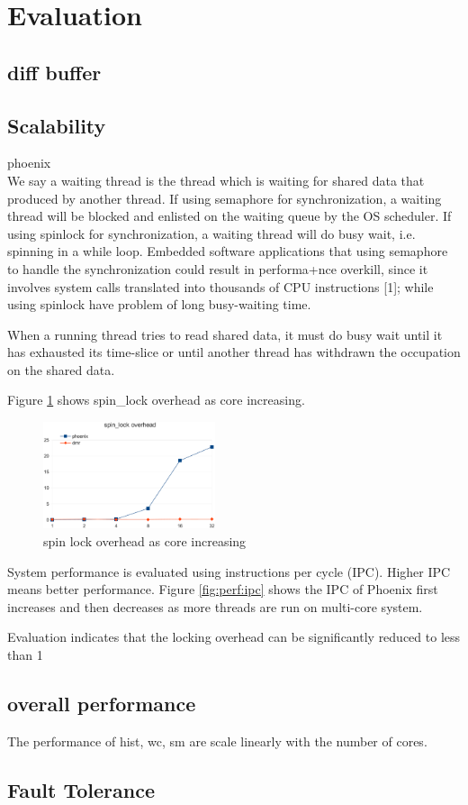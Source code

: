 \section{Evaluation}


\subsection{diff buffer}


\subsection{Scalability}
{\color{red}phoenix }
\\
We say a waiting thread is the thread which is waiting for shared
data that produced by another thread. If using semaphore for
synchronization, a waiting thread will be blocked and enlisted
on the waiting queue by the OS scheduler. If using spinlock
for synchronization, a waiting thread will do busy wait, i.e.
spinning in a while loop. Embedded software applications
that using semaphore to handle the synchronization could
result in performa+nce overkill, since it involves system calls
translated into thousands of CPU instructions [1]; while using
spinlock have problem of long busy-waiting time.

When a running thread tries to read shared data,
it must do busy wait until it has exhausted its time-slice
or until another thread has withdrawn the occupation on the
shared data. 


Figure \ref{fig:perf:spinlock} shows spin\_lock overhead
as core increasing.
\begin{figure}[!h!t]  
    \centering
    \includegraphics[width=0.45\textwidth]{eps/perf_spinlock.eps}
    \caption{spin lock overhead as core increasing}
    \label{fig:perf:spinlock}
\end{figure}



System performance is evaluated using
instructions per cycle (IPC). Higher IPC means
better performance.
Figure \ref{fig:perf:ipc} shows the IPC of Phoenix first increases 
and then decreases as more threads are run on multi-core system.


{\color{red}\myds }
Evaluation indicates that
the locking overhead can be significantly reduced to less
than 1%


\subsection{overall performance}


The performance of hist, wc, sm are scale linearly with the number of cores.
\subsection{Fault Tolerance}
